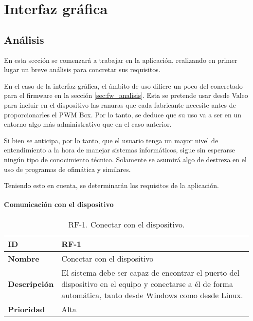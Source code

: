 \chapter{Interfaz gráfica}
\label{ch:ui}

\section{Análisis}
\label{sec:ui_analisis}

En esta sección se comenzará a trabajar en la aplicación, realizando en primer lugar un breve análisis para concretar sus requisitos.

En el caso de la interfaz gráfica, el ámbito de uso difiere un poco del concretado para el firmware en la sección \ref{sec:fw_analisis}. Esta se pretende usar desde Valeo para incluir en el dispositivo las ranuras que cada fabricante necesite antes de proporcionarles el PWM Box. Por lo tanto, se deduce que su uso va a ser en un entorno algo más administrativo que en el caso anterior.

Si bien se anticipa, por lo tanto, que el usuario tenga un mayor nivel de entendimiento a la hora de manejar sistemas informáticos, sigue sin esperarse ningún tipo de conocimiento técnico. Solamente se asumirá algo de destreza en el uso de programas de ofimática y similares.

Teniendo esto en cuenta, se determinarán los requisitos de la aplicación.

\subsubsection{Comunicación con el dispositivo}
\label{subsub:ui_requisitos}

\begin{table}[h!]
    \centering
    \begin{tabular}{|m{2.5cm}|m{9.27cm}|}
        \hline
        \textbf{ID} & RF-1 \\
        \hline
        \textbf{Nombre} & Conectar con el dispositivo \\
        \hline
        \textbf{Descripción} & El sistema debe ser capaz de encontrar el puerto del dispositivo en el equipo y conectarse a él de forma automática, tanto desde Windows como desde Linux. \\
        \hline
        \textbf{Prioridad} & Alta \\
        \hline
    \end{tabular}
    \caption{RF-1. Conectar con el dispositivo.}
\end{table}

